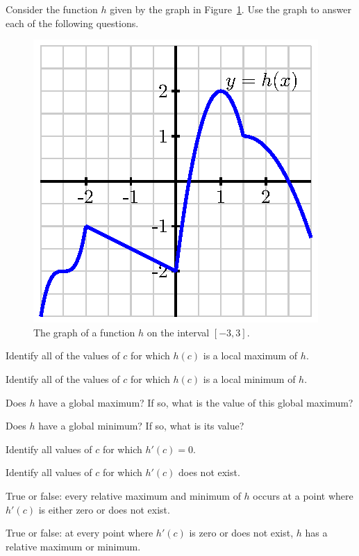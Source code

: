 \begin{pa} \label{PA:3.1}
Consider the function $h$ given by the graph in Figure~\ref{F:3.1.PA1}.  Use the graph to answer each of the following questions.
\begin{figure}[h]
\begin{center}
\includegraphics{figures/3_1_PA1.eps}
\caption{The graph of a function $h$ on the interval $[-3,3]$.} \label{F:3.1.PA1}
\end{center}
\end{figure}
\ba
	\item Identify all of the values of $c$ for which $h(c)$ is a local maximum of $h$.
	\item Identify all of the values of $c$ for which $h(c)$ is a local minimum of $h$.
	\item Does $h$ have a global maximum?  If so, what is the value of this global maximum?
	\item Does $h$ have a global minimum?  If so, what is its value?
	\item Identify all values of $c$ for which $h'(c) = 0$.
	\item Identify all values of $c$ for which $h'(c)$ does not exist.
	\item True or false: every relative maximum and minimum of $h$ occurs at a point where $h'(c)$ is either zero or does not exist.
	\item True or false: at every point where $h'(c)$ is zero or does not exist, $h$ has a relative maximum or minimum.
\ea
\end{pa} \afterpa